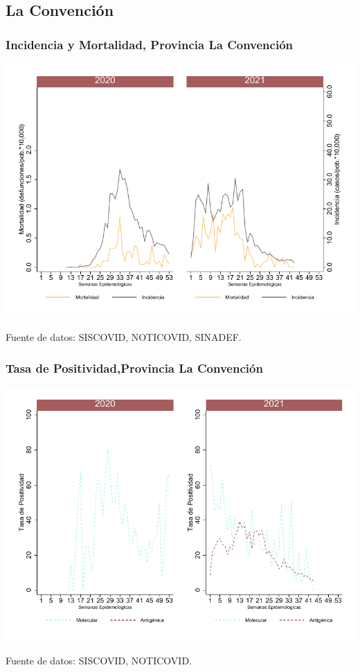 \documentclass[xcolor=table]{beamer}
\begin{document}
\subsection{La Convención}

\begin{frame}[label=laconvencion]
	\frametitle{Incidencia y Mortalidad, Provincia La Convención}
	\vspace{-.5cm}
	\begin{center}
		\includegraphics[width=0.8\linewidth, trim={0cm .5cm 0cm 0.2cm},clip]{../figuras/incidencia_mortalidad_20_21_9.pdf}
	\end{center}
	{\tiny Fuente de datos: SISCOVID, NOTICOVID, SINADEF.}
\end{frame}

\begin{frame}
	\frametitle{Tasa de Positividad,Provincia La Convención}
	\vspace{-.5cm}
	\begin{center}
		\includegraphics[width=0.8\linewidth, trim={0cm .5cm 0cm 0.2cm},clip]{../figuras/positividad_20_21_9.pdf}
	\end{center}
	{\tiny Fuente de datos: SISCOVID, NOTICOVID.}
\end{frame}
\end{document}
